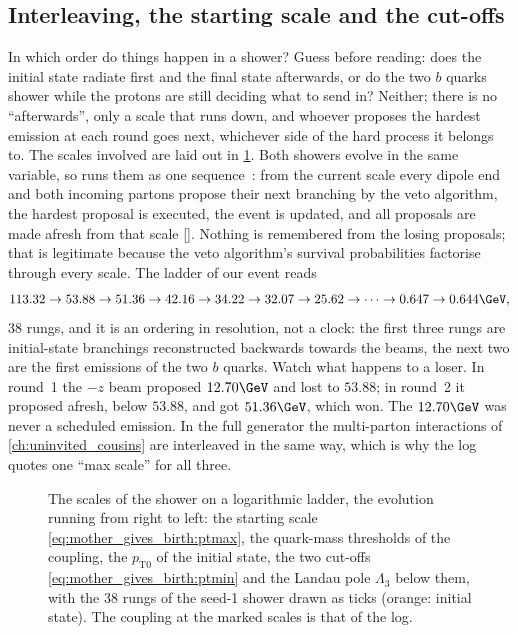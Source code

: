 \subsection{Interleaving, the starting scale and the cut-offs}
\label{sec:mother_gives_birth:scales}

In which order do things happen in a shower? Guess before reading: does the
initial state radiate first and the final state afterwards, or do the two
$b$ quarks shower while the protons are still deciding what to send in?
Neither; there is no ``afterwards'', only a scale that runs down, and
whoever proposes the hardest emission at each round goes next, whichever
side of the hard process it belongs to. The scales involved are laid out in
\cref{fig:mother_gives_birth:scale_ladder}.
Both showers evolve in the same variable, so \PYTHIA runs them as one
sequence~\cite{Sjostrand:2004ef}: from the current scale every dipole end
and both incoming partons propose their next branching by the veto
algorithm, the hardest proposal is executed, the event is updated, and all
proposals are made afresh from that scale []. Nothing is
remembered from the losing proposals; that is legitimate because the veto
algorithm's survival probabilities factorise through every scale. The
ladder of our event reads
\begin{equation*}
  113.32\to53.88\to51.36\to42.16\to34.22\to32.07\to25.62\to\cdots
  \to0.647\to0.644\GeV ,
\end{equation*}
38 rungs, and it is an ordering in resolution, not a clock: the first
three rungs are initial-state branchings reconstructed backwards towards
the beams, the next two are the first emissions of the two $b$ quarks.
Watch what happens to a loser. In round~1 the $-z$ beam proposed
$12.70\GeV$ and lost to $53.88$; in round~2 it proposed afresh, below
$53.88$, and got $51.36\GeV$, which won. The $12.70\GeV$ was never a
scheduled emission. In the
full generator the multi-parton interactions of \cref{ch:uninvited_cousins}
are interleaved in the same way, which is why the \CMSSW log quotes one
``max \pt scale'' for all three.

\begin{figure}[htbp]\centering
\resizebox{\textwidth}{!}{}
\caption[The scales of the shower on a logarithmic ladder with the 38 rungs of our event]{The scales of the shower on a logarithmic ladder, the evolution running from right to left: the starting scale \cref{eq:mother_gives_birth:ptmax}, the quark-mass thresholds of the coupling, the $p_{\mathrm{T}0}$ of the initial state, the two cut-offs \cref{eq:mother_gives_birth:ptmin} and the Landau pole $\Lambda_3$ below them, with the $38$ rungs of the seed-1 shower drawn as ticks (orange: initial state). The coupling at the marked scales is that of the  log.}
\label{fig:mother_gives_birth:scale_ladder}
\end{figure}

